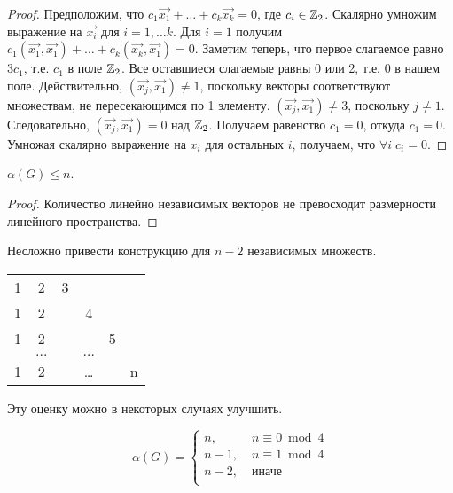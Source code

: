 \begin{proof}
	Предположим, что $ c_1 \overrightarrow{x_1} + \ldots + c_k \overrightarrow{x_k} = 0 $, где $ c_i \in \mathbb{Z}_2 $.
	Скалярно умножим выражение на $ \overrightarrow{x_i} $ для $ i = 1, \ldots k $.
	Для $ i = 1 $ получим $ c_1 (\overrightarrow{x_1}, \overrightarrow{x_1}) + \ldots + c_k (\overrightarrow{x_k}, \overrightarrow{x_1}) = 0$. Заметим теперь, что первое слагаемое равно $ 3 c_1 $, т.е. $ c_1 $ в поле $ \mathbb{Z}_2 $. Все оставшиеся слагаемые равны 0 или 2, т.е. 0 в нашем поле. Действительно, $ (\overrightarrow{x_j}, \overrightarrow{x_1}) \neq 1 $, поскольку векторы соответствуют множествам, не пересекающимся по 1 элементу. $ (\overrightarrow{x_j}, \overrightarrow{x_1}) \neq 3 $, поскольку $ j \neq 1 $. Следовательно, $ (\overrightarrow{x_j}, \overrightarrow{x_1}) = 0 $ над $ \mathbb{Z}_2 $. Получаем равенство $ c_1 = 0$, откуда $ c_1 = 0 $. Умножая скалярно выражение на $ x_i $ для остальных $ i $, получаем, что $ \forall i \; c_i = 0 $.
\end{proof}

\begin{corollary}
	$ \alpha(G) \leqslant n $.
\end{corollary} \label{cor:alpha}

\begin{proof}
	Количество линейно независимых векторов не превосходит размерности линейного пространства. 
\end{proof}

Несложно привести конструкцию для $ n - 2 $ независимых множеств.

\begin{center}
	\begin{tabular}[h!]{cccccc} 
		1 & 2 & 3 &&& \\ 
		1 & 2 & & 4 && \\ 
		1 & 2 & & & 5 & \\
		& $\ldots$ & & $ \ldots $ &&  \\
		1 & 2 & & \ldots & & \hspace{5ex} n
	\end{tabular}
\end{center}

Эту оценку можно в некоторых случаях улучшить.

\begin{theorem}
	$$
	\alpha(G)=\begin{cases}
		n, & \; n \equiv 0\bmod 4\\
		n - 1, & \; n \equiv 1 \bmod{4}\\
		n - 2, & \; \text{иначе} \\
	\end{cases}
	$$
\end{theorem}


